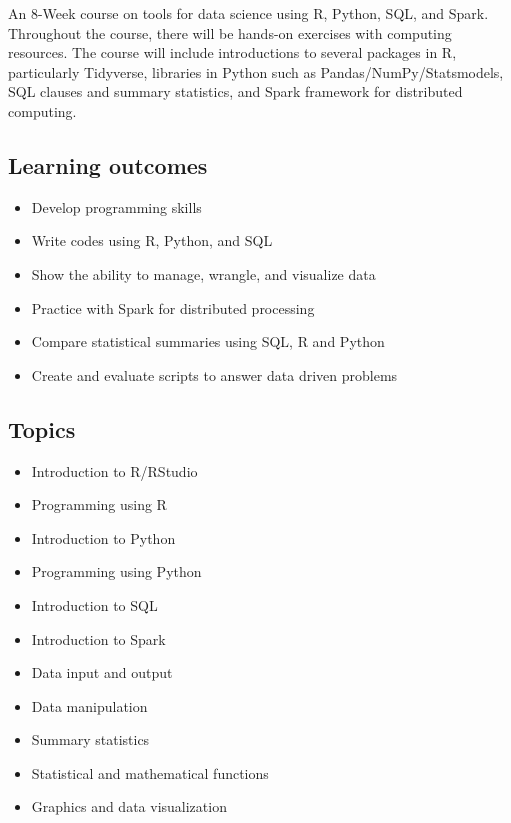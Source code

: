 \documentclass[
  letterpaper,
  DIV=11,
  numbers=noendperiod]{scrreprt}
\providecommand{\tightlist}{%
  \setlength{\itemsep}{0pt}\setlength{\parskip}{0pt}}\usepackage{longtable,booktabs,array}
\begin{document}

An 8-Week course on tools for data science using R, Python, SQL, and
Spark. Throughout the course, there will be hands-on exercises with
computing resources. The course will include introductions to several
packages in R, particularly Tidyverse, libraries in Python such as
Pandas/NumPy/Statsmodels, SQL clauses and summary statistics, and Spark
framework for distributed computing.

\hypertarget{learning-outcomes}{%
\subsection*{Learning outcomes}\label{learning-outcomes}}

\begin{itemize}
\tightlist
\item
  Develop programming skills
\item
  Write codes using R, Python, and SQL
\item
  Show the ability to manage, wrangle, and visualize data
\item
  Practice with Spark for distributed processing
\item
  Compare statistical summaries using SQL, R and Python
\item
  Create and evaluate scripts to answer data driven problems
\end{itemize}

\hypertarget{topics-1}{%
\subsection*{Topics}\label{topics-1}}

\begin{itemize}
\tightlist
\item
  Introduction to R/RStudio
\item
  Programming using R
\item
  Introduction to Python
\item
  Programming using Python
\item
  Introduction to SQL
\item
  Introduction to Spark
\item
  Data input and output
\item
  Data manipulation
\item
  Summary statistics
\item
  Statistical and mathematical functions
\item
  Graphics and data visualization
\end{itemize}
\end{document}
